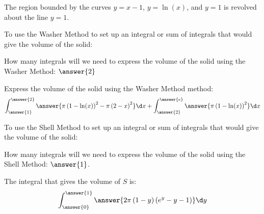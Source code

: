 \documentclass{ximera}
\author{ Jason Miller}
\begin{document}
\begin{exercise}

The region bounded by the curves $y=x-1$, $y=\ln(x)$, and $y=1$ is revolved about the line $y=1$. 

To use the Washer Method to set up an integral or sum of integrals that would give the volume of the solid: 

  \begin{multipleChoice}
  \end{multipleChoice}

How many integrals will we need to express the volume of the solid using the Washer Method: $\answer{2}$

\begin{exercise}

Express the volume of the solid using the Washer Method method: 
\[
\int_{\answer{1}}^{\answer{2}} \answer{ \pi \left( 1 - \ln(x) \right)^{2} - \pi \left( 2-x \right)^{2} } \d x + \int_{\answer{2}}^{\answer{e}} \answer{ \pi \left( 1- \ln(x) \right)^{2} } \d x
\]
\end{exercise}
\end{exercise}

\begin{exercise}

To use the Shell Method to set up an integral or sum of integrals that would give the volume of the solid: 

  \begin{multipleChoice}
  \end{multipleChoice}

How many integrals will we need to express the volume of the solid using the Shell Method: $\answer{1}$. 


\begin{exercise} 
The integral that gives the volume of $S$ is: 
\[
\int_{\answer{0}}^{\answer{1}} \answer{ 2\pi \left( 1-y \right) \left( e^{y}-y-1 \right)} \d y
\] 


\end{exercise}
\end{exercise}
\end{document}
